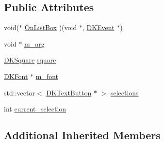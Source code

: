 \subsection*{Public Attributes}
\begin{DoxyCompactItemize}
\item 
void($\ast$ \hyperlink{class_d_k_list_box_ae6665f42ad516fa0ce5471136a5be0ac}{On\-List\-Box} )(void $\ast$, \hyperlink{class_d_k_event}{D\-K\-Event} $\ast$)
\item 
void $\ast$ \hyperlink{class_d_k_list_box_a12ab490712636fff3dce5bbcaf3cc129}{m\-\_\-arg}
\item 
\hyperlink{class_d_k_square}{D\-K\-Square} \hyperlink{class_d_k_list_box_acac57a4ff43952d752bb7f7bc03df46c}{square}
\item 
\hyperlink{class_d_k_font}{D\-K\-Font} $\ast$ \hyperlink{class_d_k_list_box_a202a56d1285c4c8a54972d174aa06433}{m\-\_\-font}
\item 
std\-::vector$<$ \hyperlink{class_d_k_text_button}{D\-K\-Text\-Button} $\ast$ $>$ \hyperlink{class_d_k_list_box_a913eb79de209938ce6ee29ce84112971}{selections}
\item 
int \hyperlink{class_d_k_list_box_a5e1637d160e99de9a037db5a2fa01e32}{current\-\_\-selection}
\end{DoxyCompactItemize}
\subsection*{Additional Inherited Members}


